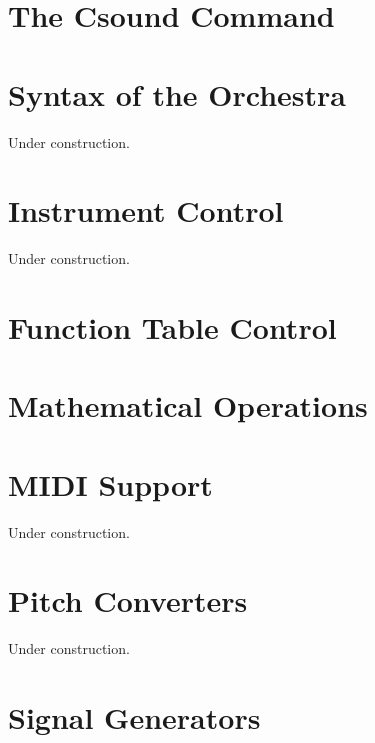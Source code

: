 \documentclass[10pt,letterpaper,onecolumn]{book}
\begin{document}
\chapter{The Csound Command}






\chapter{Syntax of the Orchestra}

Under construction.

\chapter{Instrument Control}

Under construction.

\chapter{Function Table Control}





\chapter{Mathematical Operations}

%






\chapter{MIDI Support}

Under construction.

\chapter{Pitch Converters}

Under construction.

\chapter{Signal Generators}
\end{document}

